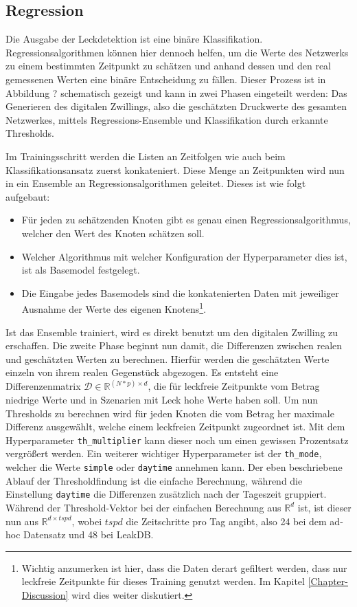 \subsection*{Regression}

Die Ausgabe der Leckdetektion ist eine binäre Klassifikation. Regressionsalgorithmen können hier dennoch helfen,
 um die Werte des Netzwerks zu einem bestimmten Zeitpunkt zu schätzen und anhand dessen und den real gemessenen
 Werten eine binäre Entscheidung zu fällen. Dieser Prozess ist in Abbildung ? schematisch gezeigt und kann in
 zwei Phasen eingeteilt werden: Das Generieren des digitalen Zwillings, also die geschätzten Druckwerte des
 gesamten Netzwerkes, mittels Regressions-Ensemble und Klassifikation durch erkannte Thresholds.

Im Trainingsschritt werden die Listen an Zeitfolgen wie auch beim Klassifikationsansatz zuerst konkateniert.
 Diese Menge an Zeitpunkten wird nun in ein Ensemble an Regressionsalgorithmen geleitet. Dieses ist wie folgt
 aufgebaut:

\begin{itemize}
    \item Für jeden zu schätzenden Knoten gibt es genau einen Regressionsalgorithmus, welcher den Wert des Knoten
     schätzen soll.
    \item Welcher Algorithmus mit welcher Konfiguration der Hyperparameter dies ist, ist als Basemodel festgelegt.
    \item Die Eingabe jedes Basemodels sind die konkatenierten Daten mit jeweiliger Ausnahme der Werte des eigenen
     Knotens\footnote{Wichtig anzumerken ist hier, dass die Daten derart gefiltert werden, dass nur leckfreie
     Zeitpunkte für dieses Training genutzt werden. Im Kapitel \ref{Chapter-Discussion} wird dies weiter
     diskutiert.}.
\end{itemize}

Ist das Ensemble trainiert, wird es direkt benutzt um den digitalen Zwilling zu erschaffen. Die zweite Phase
 beginnt nun damit, die Differenzen zwischen realen und geschätzten Werten zu berechnen. Hierfür werden die
 geschätzten Werte einzeln von ihrem realen Gegenstück abgezogen. Es entsteht eine Differenzenmatrix
 $\mathcal{D} \in \mathbb{R}^{(N*p) \times d}$, die für leckfreie Zeitpunkte vom Betrag niedrige Werte und in
 Szenarien mit Leck hohe Werte haben soll. Um nun Thresholds zu berechnen wird für jeden Knoten die vom Betrag
 her maximale Differenz ausgewählt, welche einem leckfreien Zeitpunkt zugeordnet ist. Mit dem Hyperparameter
 \texttt{th\_multiplier} kann dieser noch um einen gewissen Prozentsatz vergrößert werden. Ein weiterer wichtiger
 Hyperparameter ist der \texttt{th\_mode}, welcher die Werte \texttt{simple} oder \texttt{daytime} annehmen kann.
 Der eben beschriebene Ablauf der Thresholdfindung ist die einfache Berechnung, während die Einstellung
 \texttt{daytime} die Differenzen zusätzlich nach der Tageszeit gruppiert. Während der Threshold-Vektor bei der
 einfachen Berechnung aus $\mathbb{R}^d$ ist, ist dieser nun aus $\mathbb{R}^{d \times tspd}$, wobei $tspd$ die
 Zeitschritte pro Tag angibt, also 24 bei dem ad-hoc Datensatz und 48 bei LeakDB.

